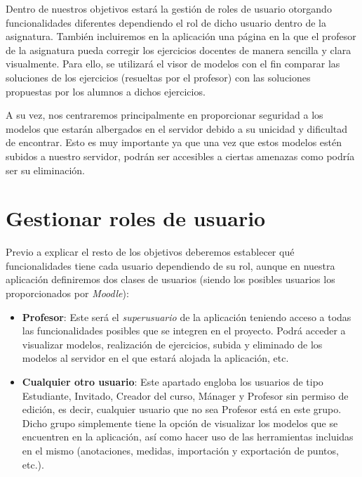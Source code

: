 
Dentro de nuestros objetivos estará la gestión de roles de usuario otorgando funcionalidades diferentes dependiendo el rol de dicho usuario dentro de la asignatura. También incluiremos en la aplicación una página en la que el profesor de la asignatura pueda corregir los ejercicios docentes de manera sencilla y clara visualmente. Para ello, se utilizará el visor de modelos con el fin comparar las soluciones de los ejercicios (resueltas por el profesor) con las soluciones propuestas por los alumnos a dichos ejercicios.

A su vez, nos centraremos principalmente en proporcionar seguridad a los modelos que estarán albergados en el servidor debido a su unicidad y dificultad de encontrar. Esto es muy importante ya que una vez que estos modelos estén subidos a nuestro servidor, podrán ser accesibles a ciertas amenazas como podría ser su eliminación.

\section{Gestionar roles de usuario}
Previo a explicar el resto de los objetivos deberemos establecer qué funcionalidades tiene cada usuario dependiendo de su rol, aunque en nuestra aplicación definiremos dos clases de usuarios (siendo los posibles usuarios los proporcionados por \textit{Moodle}):

\begin{itemize}
	\item \textbf{Profesor}: Este será el \textit{superusuario} de la aplicación teniendo acceso a todas las funcionalidades posibles que se integren en el proyecto. Podrá acceder a visualizar modelos, realización de ejercicios, subida y eliminado de los modelos al servidor en el que estará alojada la aplicación, etc.
	
	\item \textbf{Cualquier otro usuario}: Este apartado engloba los usuarios de tipo Estudiante, Invitado, Creador del curso, Mánager y Profesor sin permiso de edición, es decir, cualquier usuario que no sea Profesor está en este grupo. Dicho grupo simplemente tiene la opción de visualizar los modelos que se encuentren en la aplicación, así como hacer uso de las herramientas incluidas en el mismo (anotaciones, medidas, importación y exportación de puntos, etc.).
\end{itemize}

